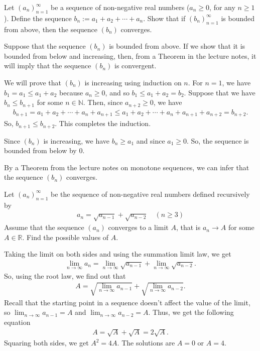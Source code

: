\documentclass[addpoints, 12pt]{exam}%
\newcommand{\bR}{\mathbb{R}}
\newcommand{\bN}{\mathbb{N}}
\newcommand{\ra}{\rightarrow}
\theoremstyle{definition}
\begin{document}
\begin{questions}
\newpage

\question[10]
Let $(a_n)_{n = 1}^\infty$ be a sequence of non-negative real numbers ($a_n \geq 0$, for any $n \geq 1$). Define the sequence $b_n := a_1 + a_2 + \cdots + a_n$. Show that if $(b_n)_{n =1}^\infty$ is bounded from above, then the sequence $(b_n)$ converges.

\begin{solution}
Suppose that the sequence $(b_n)$ is bounded from above. If we show that it is bounded from below and increasing, then, from a Theorem in the lecture notes, it will imply that the sequence $(b_n)$ is convergent.

We will prove that $(b_n)$ is increasing using induction on $n$. For $n = 1$, we have $b_1 = a_1 \leq a_1 + a_2$ because $a_n \geq 0$, and so $b_1 \leq a_1 + a_2 = b_2$. Suppose that we have $b_n \leq b_{n + 1}$ for some $n \in \bN$. Then, since $a_{n + 2} \geq 0$, we have
	\begin{align*}
	b_{n + 1} = a_1 + a_2 + \cdots + a_n + a_{n + 1} \leq a_1 + a_2 + \cdots + a_n + a_{n + 1} + a_{n +2} = b_{n + 2} .
	\end{align*}
So, $b_{n + 1} \leq b_{n + 2}$. This completes the induction. 

Since $(b_n)$ is increasing, we have $b_n \geq a_1$ and since $a_1 \geq 0$. So, the sequence is bounded from below by $0$.

By a Theorem from the lecture notes on monotone sequences, we can infer that the sequence $(b_n)$ converges.
\end{solution}

	
\newpage

\question[10]
Let $(a_n)_{n = 1}^\infty$ be the sequence of non-negative real numbers defined recursively by
	\begin{align*}
	a_n = \sqrt{a_{n-1}} + \sqrt{a_{n-2}} \quad (n \geq 3 ) 
	\end{align*}
Assume that the sequence $(a_n)$ converges to a limit $A$, that is $a_n \ra A$ for some $A \in \bR$. Find the possible values of $A$.
\begin{solution}
Taking the limit on both sides and using the summation limit law, we get
	\begin{align*}
	\lim_{n \ra \infty} a_n = \lim_{n \ra \infty} \sqrt{a_{n-1}} + \lim_{n \ra \infty} \sqrt{a_{n -2}}. 
	\end{align*}
So, using the root law, we find out that
	\begin{align*}
	A = \sqrt{\lim_{n \ra \infty} a_{n - 1}} + \sqrt{\lim_{n \ra \infty} a_{n - 2}} .
	\end{align*}
Recall that the starting point in a sequence doesn't affect the value of the limit, so $\lim_{n \ra \infty} a_{n -1} = A$ and $\lim_{n \ra \infty} a_{n - 2} = A$. Thus, we get the following equation
	\begin{align*}
	A = \sqrt{A} + \sqrt{A} = 2\sqrt{A} .
	\end{align*}
Squaring both sides, we get $A^2 = 4A$. The solutions are $A = 0$ or $A = 4$. 
\end{solution}
	
\end{questions}
\end{document}
